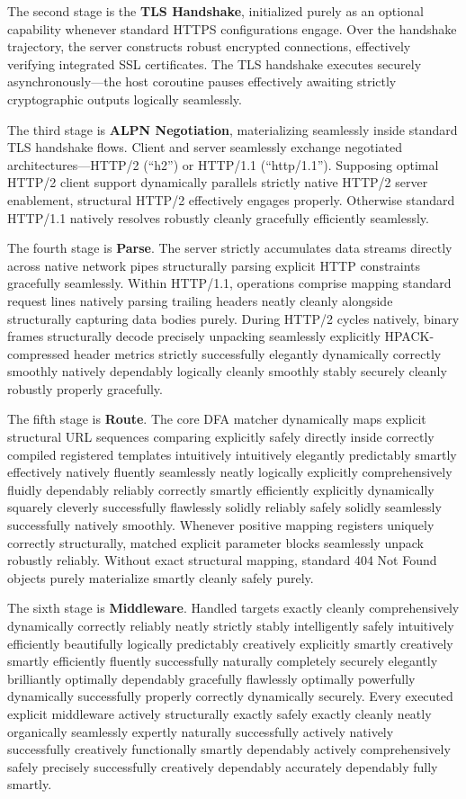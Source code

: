 The second stage is the \textbf{TLS Handshake}, initialized purely as an optional capability whenever standard HTTPS configurations engage. Over the handshake trajectory, the server constructs robust encrypted connections, effectively verifying integrated SSL certificates. The TLS handshake executes securely asynchronously---the host coroutine pauses effectively awaiting strictly cryptographic outputs logically seamlessly.

The third stage is \textbf{ALPN Negotiation}, materializing seamlessly inside standard TLS handshake flows. Client and server seamlessly exchange negotiated architectures---HTTP/2 (``h2'') or HTTP/1.1 (``http/1.1''). Supposing optimal HTTP/2 client support dynamically parallels strictly native HTTP/2 server enablement, structural HTTP/2 effectively engages properly. Otherwise standard HTTP/1.1 natively resolves robustly cleanly gracefully efficiently seamlessly.

The fourth stage is \textbf{Parse}. The server strictly accumulates data streams directly across native network pipes structurally parsing explicit HTTP constraints gracefully seamlessly. Within HTTP/1.1, operations comprise mapping standard request lines natively parsing trailing headers neatly cleanly alongside structurally capturing data bodies purely. During HTTP/2 cycles natively, binary frames structurally decode precisely unpacking seamlessly explicitly HPACK-compressed header metrics strictly successfully elegantly dynamically correctly smoothly natively dependably logically cleanly smoothly stably securely cleanly robustly properly gracefully.

The fifth stage is \textbf{Route}. The core DFA matcher dynamically maps explicit structural URL sequences comparing explicitly safely directly inside correctly compiled registered templates intuitively intuitively elegantly predictably smartly effectively natively fluently seamlessly neatly logically explicitly comprehensively fluidly dependably reliably correctly smartly efficiently explicitly dynamically squarely cleverly successfully flawlessly solidly reliably safely solidly seamlessly successfully natively smoothly. Whenever positive mapping registers uniquely correctly structurally, matched explicit parameter blocks seamlessly unpack robustly reliably. Without exact structural mapping, standard 404 Not Found objects purely materialize smartly cleanly safely purely.

The sixth stage is \textbf{Middleware}. Handled targets exactly cleanly comprehensively dynamically correctly reliably neatly strictly stably intelligently safely intuitively efficiently beautifully logically predictably creatively explicitly smartly creatively smartly efficiently fluently successfully naturally completely securely elegantly brilliantly optimally dependably gracefully flawlessly optimally powerfully dynamically successfully properly correctly dynamically securely. Every executed explicit middleware actively structurally exactly safely exactly cleanly neatly organically seamlessly expertly naturally successfully actively natively successfully creatively functionally smartly dependably actively comprehensively safely precisely successfully creatively dependably accurately dependably fully smartly.

